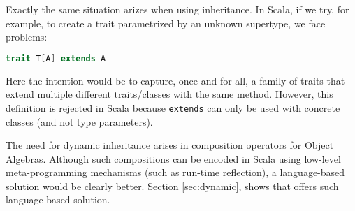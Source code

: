 Exactly the same situation arizes when using inheritance. In Scala, if
we try, for example, to create a trait parametrized by an unknown
supertype, we face problems:

\begin{lstlisting}[language=scala]
trait T[A] extends A
\end{lstlisting}

\noindent Here the intention would be to capture, once and for all, a 
family of traits that extend multiple different traits/classes with
the same method. However, this definition is rejected in Scala because 
\lstinline{extends} can only be used with concrete classes (and not
type parameters).  
 

The need for dynamic inheritance arises in composition operators for Object
Algebras. Although such compositions can be encoded in Scala using low-level
meta-programming mechanisms (such as run-time reflection), a language-based
solution would be clearly better. Section \ref{sec:dynamic}, shows that \name
offers such language-based solution.
